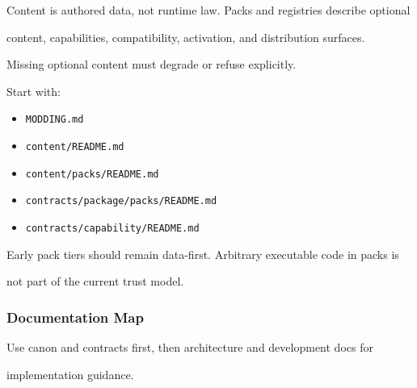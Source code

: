 \documentclass[9pt,a4paper,openany]{book}
\begin{document}
Content is authored data, not runtime law.\allowbreak{} Packs and registries describe optional

content, capabilities, compatibility, activation, and distribution surfaces.\allowbreak{}

Missing optional content must degrade or refuse explicitly.\allowbreak{}


Start with:


\begin{itemize}
\item \texttt{MODDING.\allowbreak{}md}
\item \texttt{content/\allowbreak{}README.\allowbreak{}md}
\item \texttt{content/\allowbreak{}packs/\allowbreak{}README.\allowbreak{}md}
\item \texttt{contracts/\allowbreak{}package/\allowbreak{}packs/\allowbreak{}README.\allowbreak{}md}
\item \texttt{contracts/\allowbreak{}capability/\allowbreak{}README.\allowbreak{}md}
\end{itemize}

Early pack tiers should remain data-\allowbreak{}first.\allowbreak{} Arbitrary executable code in packs is

not part of the current trust model.\allowbreak{}


\subsubsection{Documentation Map}

Use canon and contracts first, then architecture and development docs for

implementation guidance.\allowbreak{}
\end{document}
